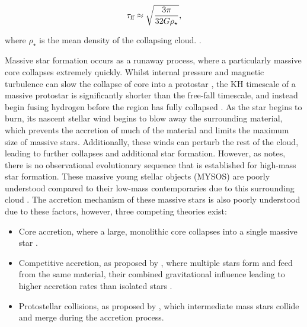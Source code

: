 \begin{equation}
  \label{eq:fftime}
  \tau_\text{ff} \approx \sqrt{\frac{3\pi}{32 G \rho_\star}} ,
\end{equation}

\noindent
where $\rho_\star$ is the mean density of the collapsing cloud.
\parencite[Ch.~3]{bodenheimerPrinciplesStarFormation2011}.

Massive star formation occurs as a runaway process, where a particularly massive core collapses extremely quickly.
Whilst internal pressure and magnetic turbulence can slow the collapse of core into a protostar \parencite{ladaEmbeddedClustersMolecular2003}, the KH timescale of a massive protostar is significantly shorter than the free-fall timescale, and instead begin fusing hydrogen before the region has fully collapsed \parencite{lawsMassiveYoungStellar2019,kahnCocoonsEarlytypeStars1974}.
As the star begins to burn, its nascent stellar wind begins to blow away the surrounding material, which prevents the accretion of much of the material and limits the maximum size of massive stars.
Additionally, these winds can perturb the rest of the cloud, leading to further collapses and additional star formation.
However, as \textcite{motteHighMassStarMassive2018} notes, there is no observational evolutionary sequence that is established for high-mass star formation.
These massive young stellar objects (MYSOS) are poorly understood compared to their low-mass contemporaries due to this surrounding cloud \parencite{frostMultiscaleExplorationMassive2019}.
The accretion mechanism of these massive stars is also poorly understood due to these factors, however, three competing theories exist:

\begin{itemize}
  \item Core accretion, where a large, monolithic core collapses into a single massive star \parencite{henningProtostarsPlanetsVI2014}.
  \item Competitive accretion, as proposed by \textcite{bonnellCompetitiveAccretionEmbedded2001}, where multiple stars form and feed from the same material, their combined gravitational influence leading to higher accretion rates than isolated stars \parencite{bonnellStarFormationGravitational2006}.
  \item Protostellar collisions, as proposed by \textcite{bonnellFormationMassiveStars1998}, which intermediate mass stars collide and merge during the accretion process.
\end{itemize}


